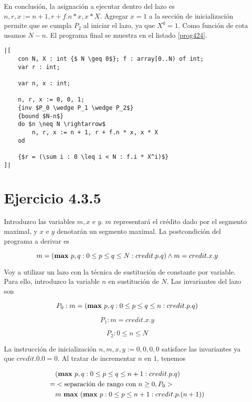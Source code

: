 \documentclass{article}
\begin{document}
En conclusión, la asignación a ejecutar dentro del lazo es
$n, r, x := n + 1, r + f.n * x, x * X$. Agregar $x = 1$ a la sección
de inicialización permite que se cumpla $P_2$ al iniciar el lazo, ya
que $X^0 = 1$. Como función de cota usamos $N-n$. El programa final se
muestra en el listado \ref{prog424}.

\begin{lstlisting}[float,caption={Solución del ejercicio 4.2.4},label=prog424]
|[
    con N, X : int {$ N \geq 0$}; f : array[0..N) of int;
    var r : int;

    var n, x : int;

    n, r, x := 0, 0, 1;
    {inv $P_0 \wedge P_1 \wedge P_2$}
    {bound $N-n$}
    do $n \neq N \rightarrow$
        n, r, x := n + 1, r + f.n * x, x * X
    od

    {$r = (\sum i : 0 \leq i < N : f.i * X^i)$}
]|
\end{lstlisting}

\section{Ejercicio 4.3.5}

Introduzco las variables $m, x$ e $y$. $m$ representará el crédito dado
por el segmento maximal, y $x$ e $y$ denotarán un segmento maximal. La
postcondición del programa a derivar es

$$
m = (\text{{\bf max} } p, q : 0 \leq p \leq q \leq N : credit.p.q) \wedge m = credit.x.y 
$$

Voy a utilizar un lazo con la técnica de sustitución de constante por variable. Para ello,
introduzco la variable $n$ en sustitución de $N$. Las invariantes del lazo son

$$
P_0: m = (\text{{\bf max} } p, q : 0 \leq p \leq q \leq n : credit.p.q)
$$

$$
P_1: m = credit.x.y
$$

$$
P_2: 0 \leq n \leq N
$$

La instrucción de inicialización $n, m, x, y := 0, 0, 0, 0$ satisface las invariantes
ya que $credit$.$0$.$0 = 0$. Al tratar de incrementar $n$ en $1$, tenemos

\begin{align*}
 & (\text{{\bf max} } p, q : 0 \leq p \leq q \leq n + 1 : credit.p.q) \\
 = & <\text{separación de rango con } n \geq 0, P_0> \\
 & m \text{ {\bf max} } (\text{{\bf max} } p : 0 \leq p \leq n + 1 : credit.p.(n+1)) \\
\end{align*}
\end{document}
